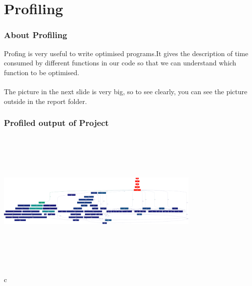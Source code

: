 \documentclass[t,compress,11pt,xcolor=dvipsnames]{beamer}
\begin{document}
\section{Profiling}
\begin{frame}
\frametitle{About Profiling}
Profing is very useful to write optimised programs.It gives the description of time consumed by different functions in our code so that we can understand which function to be optimised.\\~\\
The picture in the next slide is very big, so to see clearly, you can see the picture outside in the report folder.
\end{frame}
\begin{frame}
\frametitle{Profiled output of Project}
\begin{center}
\includegraphics[width=10cm,height=7cm]{gprof}
\end{center}
c\end{frame}
\end{document}

